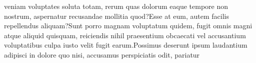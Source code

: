 \documentclass[letterpaper]{article} %
\begin{document}
veniam voluptates soluta totam, rerum quas dolorum eaque tempore non nostrum, aspernatur recusandae mollitia quod?Esse at eum, autem facilis repellendus aliquam?Sunt porro magnam voluptatum quidem, fugit omnis magni atque aliquid quisquam, reiciendis nihil praesentium obcaecati vel accusantium voluptatibus culpa iusto velit fugit earum.Possimus deserunt ipsum laudantium adipisci in dolore quo nisi, accusamus perspiciatis odit, pariatur

\end{document}
